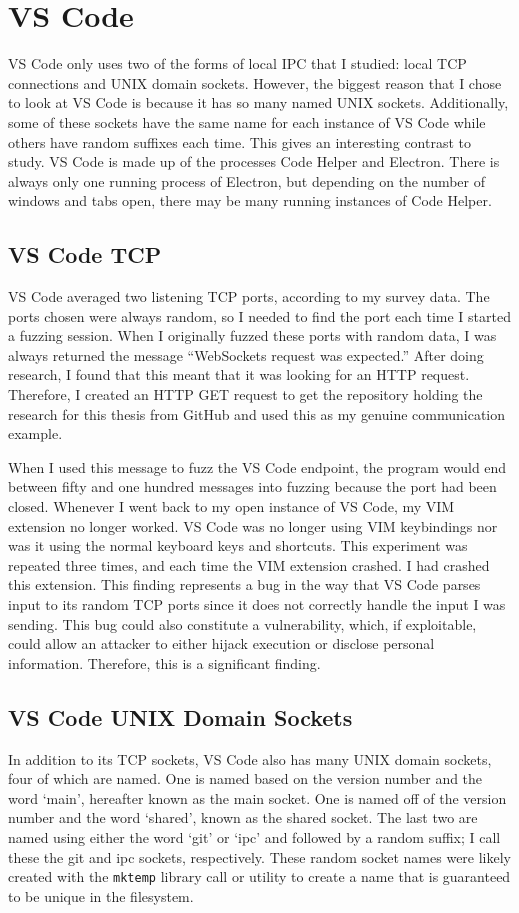 \section{VS Code}
\label{sec:code}
VS Code only uses two of the forms of local IPC that I studied: local TCP connections and UNIX domain sockets.  However, the biggest reason that I chose to look at VS Code is because it has so many named UNIX sockets.  Additionally, some of these sockets have the same name for each instance of VS Code while others have random suffixes each time.  This gives an interesting contrast to study.  VS Code is made up of the processes Code Helper and Electron.  There is always only one running process of Electron, but depending on the number of windows and tabs open, there may be many running instances of Code Helper.

\subsection{VS Code TCP}
\label{sec:codeTcp}
VS Code averaged two listening TCP ports, according to my survey data.  The ports chosen were always random, so I needed to find the port each time I started a fuzzing session.  When I originally fuzzed these ports with random data, I was always returned the message ``WebSockets request was expected.''  After doing research, I found that this meant that it was looking for an HTTP request.  Therefore, I created an HTTP GET request to get the repository holding the research for this thesis from GitHub and used this as my genuine communication example.

When I used this message to fuzz the VS Code endpoint, the program would end between fifty and one hundred messages into fuzzing because the port had been closed.  Whenever I went back to my open instance of VS Code, my VIM extension no longer worked.  VS Code was no longer using VIM keybindings nor was it using the normal keyboard keys and shortcuts.  This experiment was repeated three times, and each time the VIM extension crashed.  I had crashed this extension.  This finding represents a bug in the way that VS Code parses input to its random TCP ports since it does not correctly handle the input I was sending.  This bug could also constitute a vulnerability, which, if exploitable, could allow an attacker to either hijack execution or disclose personal information.  Therefore, this is a significant finding.

\subsection{VS Code UNIX Domain Sockets}
\label{sec:codeUnix}
In addition to its TCP sockets, VS Code also has many UNIX domain sockets,  four of which are named.  One is named based on the version number and the word `main', hereafter known as the main socket.  One is named off of the version number and the word `shared', known as the shared socket.  The last two are named using either the word `git' or `ipc' and followed by a random suffix; I call these the git and ipc sockets, respectively.  These random socket names were likely created with the \texttt{mktemp} library call or utility to create a name that is guaranteed to be unique in the filesystem.

